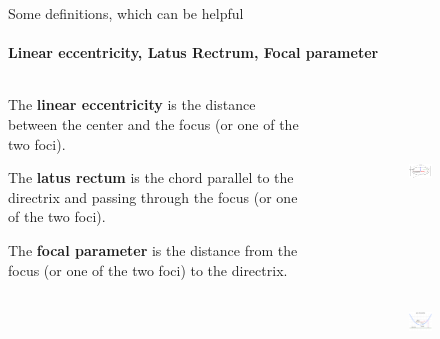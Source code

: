 \documentclass[aspectratio=169,notes]{beamer}
\begin{document}
\begin{frame}[t]{Some definitions, which can be helpful}
\framesubtitle{Linear eccentricity, Latus Rectrum, Focal parameter}
    \begin{columns}[T,onlytextwidth]
        \begin{column}{0.59\textwidth}
            The \textbf{linear eccentricity} is the distance between the center and the focus (or one of the two foci). \medskip 
            
            The \textbf{latus rectum} is the chord parallel to the directrix and passing through the focus (or one of the two foci). \medskip 
            
            The \textbf{focal parameter} is the distance from the focus (or one of the two foci) to the directrix.

        \end{column}
        \begin{column}{0.39\textwidth}
            \vspace{-1cm}
            \begin{figure}[H]
                \begin{subfigure}{0.99\textwidth}
                    \centering\includegraphics[height=4cm,width=1\textwidth,keepaspectratio]{ellipse_focal.png}
                    \label{fig:ellipse_focal.png}
                \end{subfigure}

                \begin{subfigure}{0.99\textwidth}
                    \vspace{-0.6cm}
                    \centering\includegraphics[height=3cm,width=1\textwidth,keepaspectratio]{parabola_focus.png}
                    \label{fig:parabola_focus.png}
                \end{subfigure}
            \end{figure}
        \end{column}
    \end{columns}
\end{frame}
\end{document}
